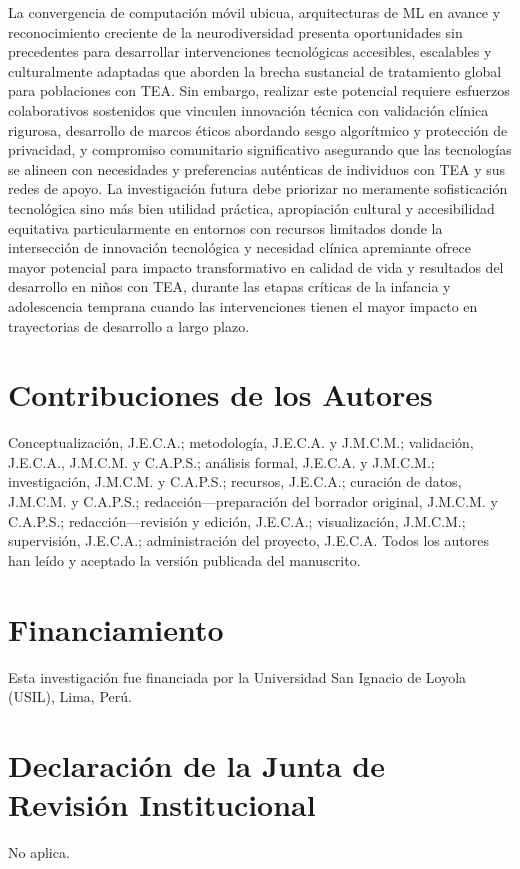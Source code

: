 \documentclass{ieeeaccess}
\begin{document}
	La convergencia de computación móvil ubicua, arquitecturas de ML en avance y reconocimiento creciente de la neurodiversidad presenta oportunidades sin precedentes para desarrollar intervenciones tecnológicas accesibles, escalables y culturalmente adaptadas que aborden la brecha sustancial de tratamiento global para poblaciones con TEA. Sin embargo, realizar este potencial requiere esfuerzos colaborativos sostenidos que vinculen innovación técnica con validación clínica rigurosa, desarrollo de marcos éticos abordando sesgo algorítmico y protección de privacidad, y compromiso comunitario significativo asegurando que las tecnologías se alineen con necesidades y preferencias auténticas de individuos con TEA y sus redes de apoyo. La investigación futura debe priorizar no meramente sofisticación tecnológica sino más bien utilidad práctica, apropiación cultural y accesibilidad equitativa particularmente en entornos con recursos limitados donde la intersección de innovación tecnológica y necesidad clínica apremiante ofrece mayor potencial para impacto transformativo en calidad de vida y resultados del desarrollo en niños con TEA, durante las etapas críticas de la infancia y adolescencia temprana cuando las intervenciones tienen el mayor impacto en trayectorias de desarrollo a largo plazo.
	
	\section*{Contribuciones de los Autores}
	Conceptualización, J.E.C.A.; metodología, J.E.C.A. y J.M.C.M.; validación, J.E.C.A., J.M.C.M. y C.A.P.S.; análisis formal, J.E.C.A. y J.M.C.M.; investigación, J.M.C.M. y C.A.P.S.; recursos, J.E.C.A.; curación de datos, J.M.C.M. y C.A.P.S.; redacción---preparación del borrador original, J.M.C.M. y C.A.P.S.; redacción---revisión y edición, J.E.C.A.; visualización, J.M.C.M.; supervisión, J.E.C.A.; administración del proyecto, J.E.C.A. Todos los autores han leído y aceptado la versión publicada del manuscrito.
	
	\section*{Financiamiento}
	Esta investigación fue financiada por la Universidad San Ignacio de Loyola (USIL), Lima, Perú.
	
	\section*{Declaración de la Junta de Revisión Institucional}
	No aplica.
	
\end{document}
